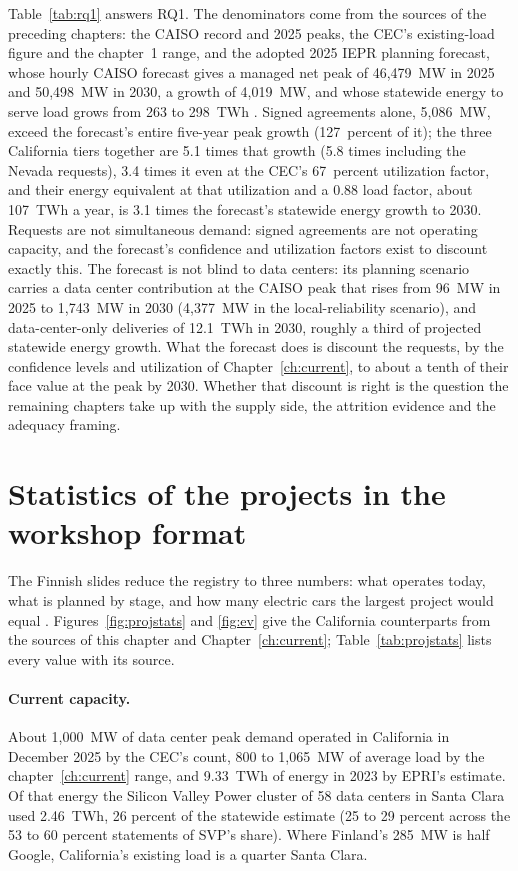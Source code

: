 Table~\ref{tab:rq1} answers RQ1. The denominators come from the sources of the preceding chapters: the CAISO record and 2025 peaks, the CEC's existing-load figure and the chapter~1 range, and the adopted 2025 IEPR planning forecast, whose hourly CAISO forecast gives a managed net peak of 46,479~MW in 2025 and 50,498~MW in 2030, a growth of 4,019~MW, and whose statewide energy to serve load grows from 263 to 298~TWh \citep{ced2025_tables}. Signed agreements alone, 5,086~MW, exceed the forecast's entire five-year peak growth (127~percent of it); the three California tiers together are 5.1 times that growth (5.8 times including the Nevada requests), 3.4 times it even at the CEC's 67~percent utilization factor, and their energy equivalent at that utilization and a 0.88 load factor, about 107~TWh a year, is 3.1 times the forecast's statewide energy growth to 2030. Requests are not simultaneous demand: signed agreements are not operating capacity, and the forecast's confidence and utilization factors exist to discount exactly this. The forecast is not blind to data centers: its planning scenario carries a data center contribution at the CAISO peak that rises from 96~MW in 2025 to 1,743~MW in 2030 (4,377~MW in the local-reliability scenario), and data-center-only deliveries of 12.1~TWh in 2030, roughly a third of projected statewide energy growth. What the forecast does is discount the requests, by the confidence levels and utilization of Chapter~\ref{ch:current}, to about a tenth of their face value at the peak by 2030. Whether that discount is right is the question the remaining chapters take up with the supply side, the attrition evidence and the adequacy framing.

\section{Statistics of the projects in the workshop format}
\label{sec:projstats}

The Finnish slides reduce the registry to three numbers: what operates today, what is planned by stage, and how many electric cars the largest project would equal \citep{manner2026}. Figures~\ref{fig:projstats} and \ref{fig:ev} give the California counterparts from the sources of this chapter and Chapter~\ref{ch:current}; Table~\ref{tab:projstats} lists every value with its source.

\paragraph{Current capacity.} About 1,000~MW of data center peak demand operated in California in December 2025 by the CEC's count, 800 to 1,065~MW of average load by the chapter~\ref{ch:current} range, and 9.33~TWh of energy in 2023 by EPRI's estimate. Of that energy the Silicon Valley Power cluster of 58 data centers in Santa Clara used 2.46~TWh, 26 percent of the statewide estimate (25 to 29 percent across the 53 to 60 percent statements of SVP's share). Where Finland's 285~MW is half Google, California's existing load is a quarter Santa Clara.

